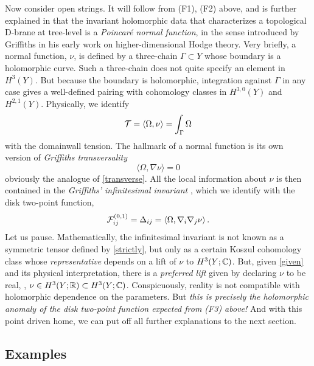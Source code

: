 Now consider open strings. It will follow from (F1), (F2) above, and is further
explained in \cite{mowa} that the invariant holomorphic data that characterizes
a topological D-brane at tree-level is a {\it Poincar\'e normal function}, in the sense
introduced by Griffiths in his early work \cite{griffiths1} on higher-dimensional
Hodge theory. Very briefly, a normal function, $\nu$, is defined by a three-chain 
$\Gamma\subset Y$ whose boundary is a holomorphic curve. Such a three-chain does 
not quite specify an element in $H^3(Y)$. But because the boundary is 
holomorphic, integration against $\Gamma$ in any case gives a well-defined pairing 
with cohomology classes in $H^{3,0}(Y)$ and $H^{2,1}(Y)$. Physically, we identify
\begin{equation}
\eqlabel{given}
\calt = \langle\Omega,\nu\rangle = \int_\Gamma \Omega
\end{equation}
with the domainwall tension. The hallmark of a normal function is its
own version of {\it Griffiths transversality} \cite{griffiths1}
\begin{equation}
\langle\Omega, \nabla\nu\rangle = 0
\end{equation}
obviously the analogue of \eqref{transverse}. All the local information about
$\nu$ is then contained in the {\it Griffiths' infinitesimal invariant} 
\cite{griffiths2,voisin,green}, which we identify with the disk two-point 
function,
\begin{equation}
\eqlabel{strictly}
\F 01_{ij} = \Delta_{ij} = \langle\Omega,\nabla_i\nabla_j\nu\rangle \,.
\end{equation}
Let us pause. Mathematically, the infinitesimal invariant is not known as
a symmetric tensor defined by \eqref{strictly}, but only as a certain Koszul
cohomology class whose {\it representative} depends on a lift of $\nu$ to 
$H^3(Y;{\mathbb C})$. But, given \eqref{given} and its physical interpretation, 
there is a {\it preferred lift} given by declaring $\nu$ to be real, \ie, $\nu\in 
H^3(Y;{\mathbb R})\subset H^3(Y;{\mathbb C})$. Conspicuously, reality is not 
compatible with holomorphic dependence on the parameters. But {\it this is 
precisely the holomorphic anomaly of the disk two-point function expected
from (F3) above!} And with this point driven home, we can put off 
all further explanations to the next section.


\subsection{Examples}

